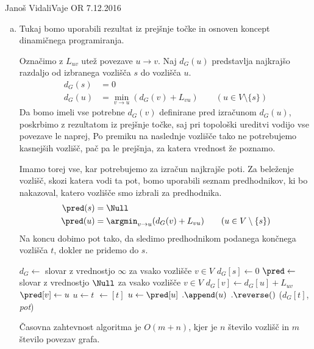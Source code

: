 \begin{naloga}{Janoš Vidali}{Vaje OR 7.12.2016}
\begin{odgovor}
\begin{enumerate}[(a)]
Klic {\sc Topo}$(G)$ nam vrne ureditev vozlišč $[g, a, h, b, c, f, d, e]$.

\item Tukaj bomo uporabili rezultat iz prejšnje točke
in osnoven koncept dinamičnega programiranja.

Označimo z $L_{uv}$ utež povezave $u \rightarrow v$.
Naj $d_G(u)$ predstavlja najkrajšo razdaljo
od izbranega vozlišča $s$ do vozlišča $u$.
\begin{align*}
d_G(s) &= 0 \\
d_G(u) &= \min_{v \rightarrow u}(d_G(v) + L_{vu})
\qquad (u \in V \setminus \{s\})
\end{align*}
Da bomo imeli vse potrebne $d_G(v)$ definirane pred izračunom $d_G(u)$,
poskrbimo z rezultatom iz prejšnje točke,
saj pri topološki ureditvi vodijo vse povezave le naprej,
Po premiku na naslednje vozlišče tako ne potrebujemo kasnejših vozlišč,
pač pa le prejšnja, za katera vrednost že poznamo.

Imamo torej vse, kar potrebujemo za izračun najkrajše poti.
Za beleženje vozlišč, skozi katera vodi ta pot,
bomo uporabili seznam predhodnikov,
ki bo nakazoval, katero vozlišče smo izbrali za predhodnika.
\begin{align*}
\pred(s) &= \Null \\
\pred(u) &= \argmin_{v \rightarrow u}(d_G(v) + L_{vu})
\qquad (u \in V \setminus \{s\})
\end{align*}
Na koncu dobimo pot tako,
da sledimo predhodnikom podanega končnega vozlišča $t$,
dokler ne pridemo do $s$.
\begin{small}
\begin{algorithmic}
	\State $d_G \gets$ slovar z vrednostjo $\infty$ za vsako vozlišče $v \in V$
	\State $d_G[s] \gets 0$
	\State $\pred \gets$ slovar z vrednostjo $\Null$ za vsako vozlišče $v \in V$
				\State $d_G[v] \gets d_G[u] + L_{uv}$
				\State $\pred[v] \gets u$
			\EndIf
		\EndFor
	\EndFor
    \State $u \gets t$
	 $\gets [t]$
	\While{$\pred[u] \ne \Null$}
        \State $u \gets \pred[u]$
		$.\append(u)$
	\EndWhile
    $.\reverse()$
	\State \Return ($d_G[t]$, {\sl pot})
\EndFunction 
\end{algorithmic}
\end{small}
Časovna zahtevnost algoritma je $O(m + n)$,
kjer je $n$ število vozlišč in $m$ število povezav grafa.


\end{enumerate}
\end{odgovor}
\end{naloga}
